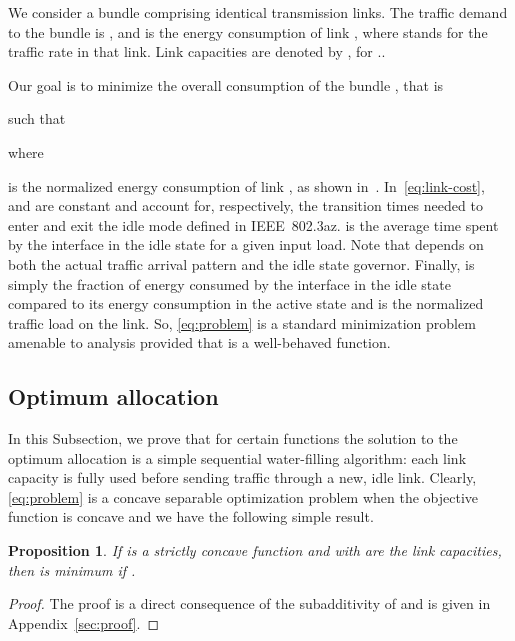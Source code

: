 \documentclass[journal,english,twocolumn,10pt,letterpaper]{IEEEtran}
\newcommand{\added}[1]{{#1}}
\newtheorem{proposition}[theorem]{Proposition}
\begin{document}
We consider a bundle comprising  identical transmission links. The traffic
demand to the bundle is , and  is the energy consumption of link
, where  stands for the traffic rate in that link. Link
capacities are denoted by , for .. 

Our goal is to minimize the overall consumption of the bundle , that is

such that

where 

is the normalized energy consumption of link , as shown
in~\cite{herreria12:_gi_g_model_gb_energ_effic_ether}.
In~\eqref{eq:link-cost},  and  are constant and account for,
respectively, the transition times needed to enter and exit the idle mode
defined in IEEE~802.\added{3}az.  is the average time spent by the
interface in the idle state for a given input load. Note that 
depends on both the actual traffic arrival pattern and the idle state
governor. Finally,  is simply the fraction of energy
consumed by the interface in the idle state compared to its energy consumption
in the active state and  is the normalized traffic load on
the \added{link. So}, \eqref{eq:problem} is a standard minimization problem
amenable to analysis provided that  is a well-behaved
function.

\subsection{Optimum allocation}
\label{sec:optimal-allocation}

In this Subsection, we prove that for certain functions  the
solution to the optimum allocation is a simple sequential water-filling
algorithm: each link capacity is fully used before sending traffic through a
new, idle link. Clearly, \eqref{eq:problem} is a concave separable
optimization problem when the objective function is concave and we have the
following simple result.
\begin{proposition}
\label{propo:waterfill}
\added{ If  is a strictly concave function and
   with  are the link capacities,
  then 
 is minimum if .
}
\end{proposition}
\begin{proof}
  The proof is a direct consequence of the subadditivity of  and is
  given in \added{Appendix}~\ref{sec:proof}.
\end{proof}
\end{document}
